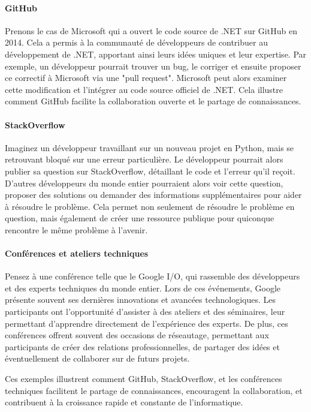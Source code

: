 \paragraph*{GitHub} Prenons le cas de Microsoft qui a ouvert le code source de .NET sur GitHub en 2014. Cela a permis à la communauté de développeurs de contribuer au développement de .NET, apportant ainsi leurs idées uniques et leur expertise. Par exemple, un développeur pourrait trouver un bug, le corriger et ensuite proposer ce correctif à Microsoft via une "pull request". Microsoft peut alors examiner cette modification et l'intégrer au code source officiel de .NET. Cela illustre comment GitHub facilite la collaboration ouverte et le partage de connaissances.

\paragraph*{StackOverflow}  Imaginez un développeur travaillant sur un nouveau projet en Python, mais se retrouvant bloqué sur une erreur particulière. Le développeur pourrait alors publier sa question sur StackOverflow, détaillant le code et l'erreur qu'il reçoit. D'autres développeurs du monde entier pourraient alors voir cette question, proposer des solutions ou demander des informations supplémentaires pour aider à résoudre le problème. Cela permet non seulement de résoudre le problème en question, mais également de créer une ressource publique pour quiconque rencontre le même problème à l'avenir.

\paragraph*{Conférences et ateliers techniques} Pensez à une conférence telle que le Google I/O, qui rassemble des développeurs et des experts techniques du monde entier. Lors de ces événements, Google présente souvent ses dernières innovations et avancées technologiques. Les participants ont l'opportunité d'assister à des ateliers et des séminaires, leur permettant d'apprendre directement de l'expérience des experts. De plus, ces conférences offrent souvent des occasions de réseautage, permettant aux participants de créer des relations professionnelles, de partager des idées et éventuellement de collaborer sur de futurs projets.

Ces exemples illustrent comment GitHub, StackOverflow, et les conférences techniques facilitent le partage de connaissances, encouragent la collaboration, et contribuent à la croissance rapide et constante de l'informatique.


